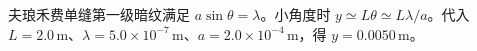 夫琅禾费单缝第一级暗纹满足 $a\sin\theta=\lambda$。小角度时 $y\simeq L\theta\simeq L\lambda/a$。代入 $L=2.0\,\mathrm m$、$\lambda=5.0\times10^{-7}\,\mathrm m$、$a=2.0\times10^{-4}\,\mathrm m$，得 $y=0.0050\,\mathrm m$。
